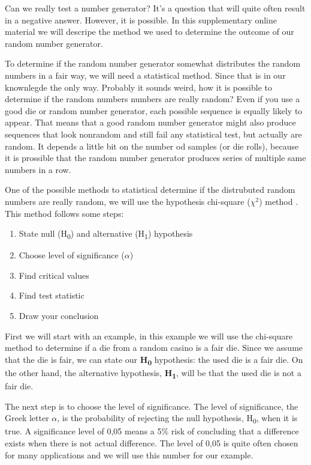 Can we really test a number generator? It's a question that will quite often result in a negative answer. However, it is possible. In this supplementary online material we will descripe the method we used to determine the outcome of our random number generator.

To determine if the random number generator somewhat distributes the random numbers in a fair way, we will need a statistical method. Since that is in our knownlegde the only way. Probably it sounds weird, how it is possible to determine if the random numbers numbers are really random? Even if you use a good die or random number generator, each possible sequence is equally likely to appear. That means that a good random number generator might also produce sequences that look nonrandom and still fail any statistical test, but actually are random. It depends a little bit on the number od samples (or die rolls), because it is prossible that the random number generator produces series of multiple same numbers in a row.

One of the possible methods to statistical determine if the distrubuted random numbers are really random, we will use the hypothesis chi-square (${\chi}^2$) method \cite{chisquareRandom} \cite{chisquare}. This method follows some steps:

\begin{enumerate}
	\itemsep0em
	\item State null (H\textsubscript{0}) and alternative (H\textsubscript{1}) hypothesis
	\item Choose level of significance ($\alpha$)
	\item Find critical values 
	\item Find test statistic
	\item Draw your conclusion
\end{enumerate}


First we will start with an example, in this example we will use the chi-square method to determine if a die from a random casino is a fair die. Since we assume that the die is fair, we can state our \textbf{H\textsubscript{0}} hypothesis: the used die is a fair die. On the other hand, the alternative hypothesis, \textbf{H\textsubscript{1}}, will be that the used die is not a fair die.

The next step is to choose the level of significance. The level of significance, the Greek letter $\alpha$, is the probability of rejecting the null hypothesis, H\textsubscript{0}, when it is true. A significance level of 0,05 means a 5\% risk of concluding that a difference exists when there is not actual difference. The level of 0,05 is quite often chosen for many applications and we will use this number for our example.

